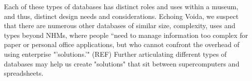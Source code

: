 Each of these types of databases has distinct roles and uses within a museum, and thus, distinct design needs and considerations. Echoing Voida, we suspect that there are numerous other databases of similar size, complexity, uses and types beyond NHMs,  where people “need to manage information too complex for paper or personal office applications, but who cannot confront the overhead of using enterprise "'solutions.'" (REF) Further articulating different types of databases may help us create "solutions" that sit between supercomputers and spreadsheets.